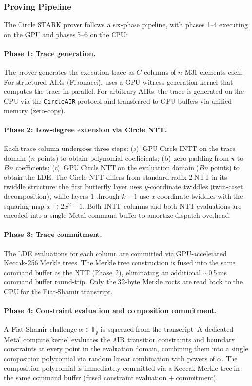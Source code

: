 \subsubsection{Proving Pipeline}
\label{sec:circle-pipeline}

The \sys Circle STARK prover follows a six-phase pipeline, with phases 1--4
executing on the GPU and phases 5--6 on the CPU:

\paragraph{Phase 1: Trace generation.}
The prover generates the execution trace as $C$ columns of $n$ M31 elements
each.  For structured AIRs (\eg Fibonacci), \sys uses a GPU witness
generation kernel that computes the trace in parallel.  For arbitrary AIRs,
the trace is generated on the CPU via the \texttt{CircleAIR} protocol and
transferred to GPU buffers via unified memory (zero-copy).

\paragraph{Phase 2: Low-degree extension via Circle NTT.}
Each trace column undergoes three steps: (a)~GPU Circle INTT on the
trace domain ($n$ points) to obtain polynomial coefficients;
(b)~zero-padding from $n$ to $Bn$ coefficients; (c)~GPU Circle NTT on
the evaluation domain ($Bn$ points) to obtain the LDE.  The Circle NTT
differs from standard radix-2 NTT in its twiddle structure: the first
butterfly layer uses $y$-coordinate twiddles (twin-coset decomposition),
while layers $1$ through $k-1$ use $x$-coordinate twiddles with the
squaring map $x \mapsto 2x^2 - 1$.  Both INTT columns and both NTT
evaluations are encoded into a single Metal command buffer to amortize
dispatch overhead.

\paragraph{Phase 3: Trace commitment.}
The LDE evaluations for each column are committed via GPU-accelerated
Keccak-256 Merkle trees.  The Merkle tree construction is fused into the
same command buffer as the NTT (Phase~2), eliminating an additional
${\sim}$0.5\,ms command buffer round-trip.  Only the 32-byte Merkle roots
are read back to the CPU for the Fiat-Shamir transcript.

\paragraph{Phase 4: Constraint evaluation and composition commitment.}
A Fiat-Shamir challenge $\alpha \in \mathbb{F}_p$ is squeezed from the
transcript.  A dedicated Metal compute kernel evaluates the AIR transition
constraints and boundary constraints at every point in the evaluation
domain, combining them into a single composition polynomial via
random linear combination with powers of $\alpha$.  The composition
polynomial is immediately committed via a Keccak Merkle tree in the
same command buffer (fused constraint evaluation + commitment).

